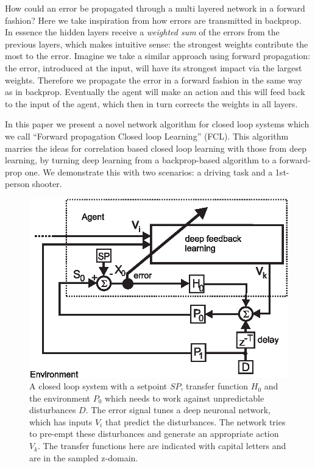 \documentclass[Afour,sageh,times]{sagej}
\begin{document}
How could an error be propagated through a multi layered network in a forward
fashion? Here we take inspiration from how errors are transmitted in
backprop. In essence the hidden layers receive a \textsl{weighted sum}
of the errors from the previous layers, which makes intuitive sense:
the strongest weights contribute the most to the error. Imagine we
take a similar approach using forward propagation: the error,
introduced at the input, will have its strongest impact via the
largest weights. Therefore we propagate the error in a forward fashion
in the same way as in backprop. Eventually the agent will make an
action and this will feed back to the input of the agent, which then
in turn corrects the weights in all layers.

In this paper we present a novel network algorithm for closed loop
systems which we call ``Forward propagation Closed loop Learning''
(FCL). This algorithm marries the ideas for correlation based closed
loop learning with those from deep learning, by turning deep learning
from a backprop-based algorithm to a forward-prop one. We demonstrate
this with two scenarios: a driving task and a 1st-person shooter.




\begin{figure}[!ht]
  \centering
  \includegraphics[width=0.75\columnwidth]{closed_loop}
  \caption{A closed loop system with a setpoint $SP$, transfer
    function $H_0$ and the environment $P_0$ which needs to work
    against unpredictable disturbances $D$.  The error signal tunes a
    deep neuronal network, which has inputs $V_i$ that predict the
    disturbances. The network tries to pre-empt these disturbances and
    generate an appropriate action $V_k$. The transfer functions here
    are indicated with capital letters and are in the sampled
    z-domain.
    \label{closed_loop}}
\end{figure}
\end{document}
